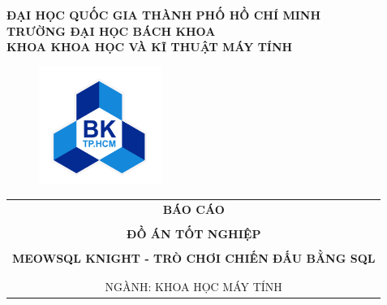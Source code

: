 \documentclass[a4paper]{article}
\theoremstyle{definition}
\begin{document}
\begin{titlepage}

\begin{center}
\LARGE \textbf{ĐẠI HỌC QUỐC GIA THÀNH PHỐ HỒ CHÍ MINH} \\
\vspace{0.2cm}
\LARGE \textbf{TRƯỜNG ĐẠI HỌC BÁCH KHOA} \\
\vspace{0.2cm}
\LARGE \textbf{KHOA KHOA HỌC VÀ KĨ THUẬT MÁY TÍNH}
\end{center}

\vspace{0.3cm}

\begin{figure}[h!]
\begin{center}
\includegraphics[width=4cm]{Images/hcmut.png}
\end{center}
\end{figure}

\begin{center}
\begin{tabular}{c}
\multicolumn{1}{c}{\textbf{{\LARGE BÁO CÁO}}}\\
\\{\textbf{{\LARGE ĐỒ ÁN TỐT NGHIỆP}}}
\\
\\
\textbf{\LARGE MEOWSQL KNIGHT - TRÒ CHƠI CHIẾN ĐẤU BẰNG SQL}
\\
\\
\\ \vspace{0.5cm} {\Large NGÀNH: KHOA HỌC MÁY TÍNH}
\end{tabular}
\end{center}
\vspace{0.5cm}



\end{titlepage}
\end{document}
